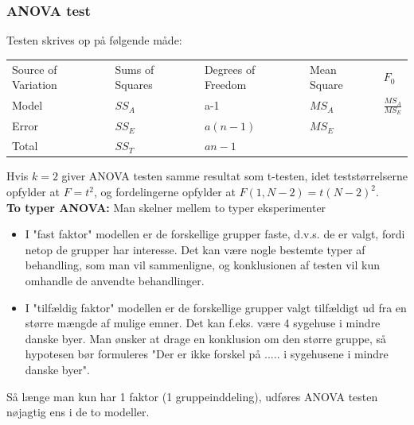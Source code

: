 \documentclass[11pt]{article}
\begin{document}
\subsubsection{ANOVA test}
Testen skrives op på følgende måde:
\begin{table}[H]
\centering
\begin{tabular}{lllll}
Source of Variation & Sums of Squares & Degrees of Freedom & Mean Square & $F_0$               \\
Model               & $SS_A$          & a-1                & $MS_A$      & $\frac{MS_A}{MS_E}$ \\
Error               & $SS_E$          & $a(n-1)$           & $MS_E$      &                     \\
Total               & $SS_T$          & $an-1$             &             &                    
\end{tabular}
\end{table}
Hvis $k = 2$ giver ANOVA testen samme resultat som t-testen, idet teststørrelserne opfylder at $F = t^2$, og fordelingerne opfylder at $F(1,N - 2) = t(N - 2)^2$.\\[0.2cm]
\textbf{To typer ANOVA:} Man skelner mellem to typer eksperimenter
\begin{itemize}\itemsep-2pt
\item I "fast faktor" modellen er de forskellige grupper faste, d.v.s. de er valgt, fordi netop de grupper har interesse. Det kan være nogle bestemte typer af behandling, som man vil sammenligne, og konklusionen af testen vil kun omhandle de anvendte behandlinger.
\item I "tilfældig faktor" modellen er de forskellige grupper valgt tilfældigt ud fra en større mængde af mulige emner. Det kan f.eks. være 4 sygehuse i mindre danske byer. Man ønsker at drage en konklusion om den større gruppe, så hypotesen bør formuleres "Der er ikke forskel på ..... i sygehusene i mindre danske byer".
\end{itemize} 
Så længe man kun har 1 faktor (1 gruppeinddeling), udføres ANOVA testen nøjagtig ens i de to modeller.
\end{document}

